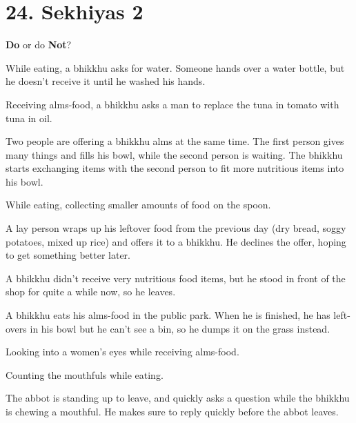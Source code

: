 \chapter{24. Sekhiyas 2}
\renewcommand*{\theChapterTitle}{24. Sekhiyas 2}

\begin{exam}{\autoExamName}

  \begin{problem*}
    \textbf{Do} or do \textbf{Not}?

    \bigskip

    \begin{parts}

    \item {} While eating, a bhikkhu asks for water. Someone hands over a
      water bottle, but he doesn't receive it until he washed his hands.

    \item {} Receiving alms-food, a bhikkhu asks a man to replace the tuna
      in tomato with tuna in oil.

    \item {} Two people are offering a bhikkhu alms at the same time. The
      first person gives many things and fills his bowl, while the second person
      is waiting. The bhikkhu starts exchanging items with the second person to
      fit more nutritious items into his bowl.

    \item {} While eating, collecting smaller amounts of food on the spoon.

    \item {} A lay person wraps up his leftover food from the previous day
      (dry bread, soggy potatoes, mixed up rice) and offers it to a bhikkhu. He
      declines the offer, hoping to get something better later.

    \item {} A bhikkhu didn't receive very nutritious food items, but he
      stood in front of the shop for quite a while now, so he leaves.

    \item {} A bhikkhu eats his alms-food in the public park. When he is
      finished, he has left-overs in his bowl but he can't see a bin, so he
      dumps it on the grass instead.

    \item {} Looking into a women's eyes while receiving alms-food.

    \item {} Counting the mouthfuls while eating.

    \item {} The abbot is standing up to leave, and quickly asks a question
      while the bhikkhu is chewing a mouthful. He makes sure to reply quickly
      before the abbot leaves.

    \end{parts}

  \end{problem*}

\end{exam}
